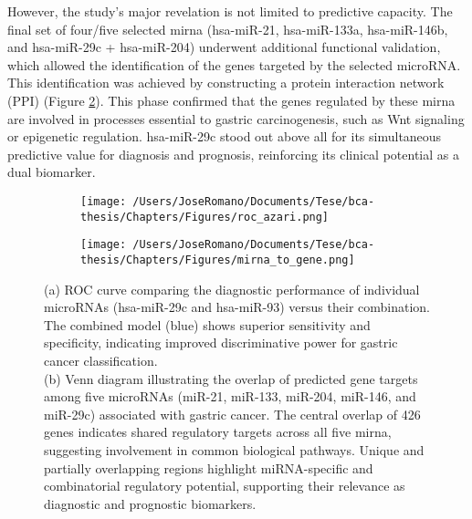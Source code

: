However, the study's major revelation is not limited to predictive capacity.
The final set of four/five selected \gls{mirna} (hsa-miR-21, hsa-miR-133a,
hsa-miR-146b, and hsa-miR-29c + hsa-miR-204) underwent additional functional
validation, which allowed the identification of the genes targeted by the
selected microRNA. This identification was achieved by constructing a protein
interaction network (PPI) (Figure \ref{fig:mirna_to_gene}). This phase
confirmed that the genes regulated by these \gls{mirna} are involved in
processes essential to gastric carcinogenesis, such as Wnt signaling or
epigenetic regulation. hsa-miR-29c stood out above all for its simultaneous
predictive value for diagnosis and prognosis, reinforcing its clinical
potential as a dual biomarker.

\begin{figure}[htbp]
  \centering
  \begin{subfigure}[b]{0.49\textwidth}
    \texttt{[image: /Users/JoseRomano/Documents/Tese/bca-thesis/Chapters/Figures/roc\_azari.png]}
    \caption{}
    \label{fig:roc_azari}
  \end{subfigure}
  \hfill
  \begin{subfigure}[b]{0.45\textwidth}
    \texttt{[image: /Users/JoseRomano/Documents/Tese/bca-thesis/Chapters/Figures/mirna\_to\_gene.png]}
    \caption{}
    \label{fig:mirna_to_gene}
  \end{subfigure}
  \caption{(a) ROC curve comparing the diagnostic performance of individual
    microRNAs (hsa-miR-29c and hsa-miR-93) versus their combination. The combined
    model (blue) shows superior sensitivity and specificity, indicating improved
    discriminative power for gastric cancer classification. \\
    \newline
    (b) Venn diagram
    illustrating the overlap of predicted gene targets
    among five microRNAs (miR-21, miR-133, miR-204, miR-146, and miR-29c)
    associated with gastric cancer. The central overlap of 426 genes indicates
    shared regulatory targets across all five \gls{mirna}, suggesting
    involvement in common biological pathways. Unique and partially overlapping
    regions highlight miRNA-specific and combinatorial regulatory potential,
    supporting their relevance as diagnostic and prognostic biomarkers.}
  \label{fig:combined}
\end{figure}

